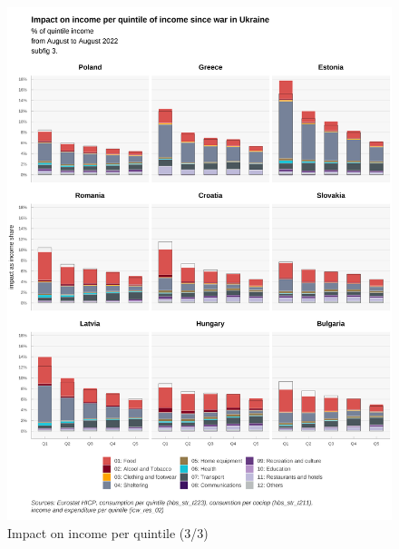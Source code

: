 \documentclass[
  9pt,
  a4paper,
  numbers=noendperiod,
  DIV=12]{scrartcl}
\begin{document}
\begin{figure}

\caption{Impact on income per quintile (3/3)}

{\centering \includegraphics{../svg/coicop_l1_1y_3.png}

}

\end{figure}
\end{document}
